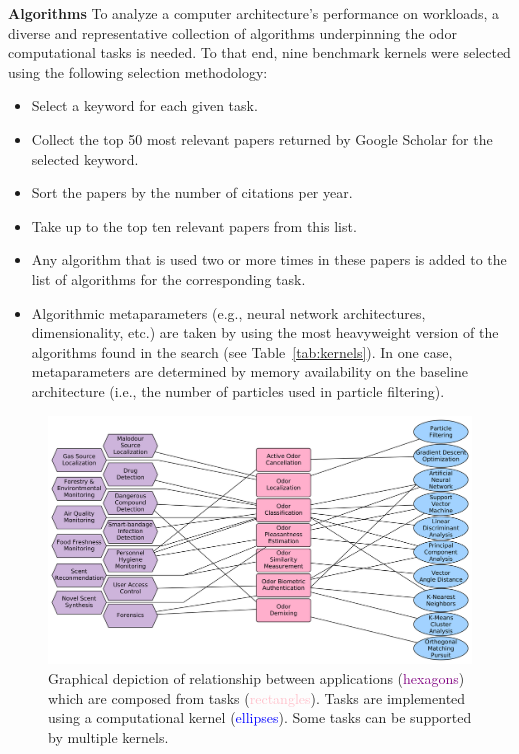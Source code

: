 \textbf{Algorithms}
To analyze a computer architecture's performance on \olfc{} workloads, a
diverse and representative collection of \olfc{} algorithms underpinning the
odor computational tasks is needed. To that end, nine benchmark kernels
were selected using the following selection methodology:
\begin{itemize}
    \item Select a keyword for each given \olfc{} task.
    \item Collect the top 50 most relevant papers returned by Google Scholar
          for the selected keyword.
    \item Sort the papers by the number of citations per year.
    \item Take up to the top ten relevant papers from this list.
    \item Any algorithm that is used two or more times in these papers is added
          to the list of algorithms for the corresponding task.
    \item Algorithmic metaparameters (e.g., neural network architectures,
          dimensionality, etc.) are taken by using the most heavyweight version
          of the algorithms found in the search (see Table~\ref{tab:kernels}).
          In one case, metaparameters
          are determined by memory availability on the baseline architecture
          (i.e., the number of particles used in particle filtering).
\end{itemize}


\begin{figure}
    \includegraphics[width=\linewidth]{./figs/app_task_kernel.png}
    \caption{
        \small Graphical depiction of relationship between applications
        (\textcolor{purple}{hexagons}) which are composed from tasks
        (\textcolor{pink}{rectangles}).  Tasks are implemented using a
        computational kernel (\textcolor{blue}{ellipses}). Some tasks can be
        supported by multiple kernels.
    }
    \label{fig:app_task_kernel}
\end{figure}

